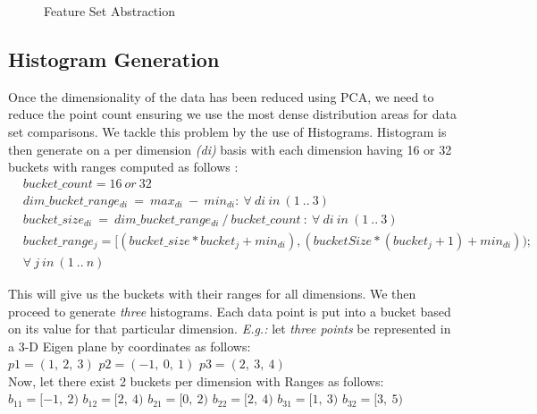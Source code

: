  \begin{figure}[!ht]
	\centering
    \hfill
    \caption{Feature Set Abstraction}
   \label{fig:pca_feature_set_abstraction}
 \end{figure}
  
\subsection{Histogram Generation}
\label{hist_generation}
  Once the dimensionality of the data has been reduced using PCA, we need to reduce the point count ensuring we use the most dense distribution areas for data set comparisons. We tackle this problem by the use of Histograms.
Histogram is then generate on a per dimension \textit{(di)} basis with each dimension having 16 or 32 buckets with ranges computed as follows : 
\begin{equation}
     \begin{aligned}
       & bucket\_count = 16 \ or \  32 \\
       & dim\_bucket\_range_{di}\  =\  max_{di} \   - \   min_{di}: \  \forall\  di\  in\  (1\   ..\   3) \\
       & bucket\_size_{di} \   = \   dim\_bucket\_range_{di} \   / \    bucket\_count \ : \  \forall\  di\  in\  (1\   ..\   3) \\
       &  bucket\_range_j = [(bucket\_size * bucket_j + min_{di}), (bucketSize * (bucket_j + 1) + min_{di})); \\  
       & \forall \ j \ in \ (1\ .. \ n)
     \end{aligned}
\end{equation}

This will give us the buckets with their ranges for all dimensions. We then proceed to generate \textit{three} histograms. Each data point is put into a bucket based on its value for that particular dimension. 
\textit{E.g.:} let \textit{three points} be represented in a 3-D Eigen plane by coordinates as follows: \\
$p1 = (1,\ 2,\ 3)$
$p2 = (-1,\ 0,\ 1)$
$p3 = (2,\ 3,\ 4)$ \\ 
Now, let there exist 2 buckets per dimension with Ranges as follows:  \\
$b_{11} = [-1,\ 2)$
$b_{12} = [2,\ 4)$
$b_{21} = [0, \ 2)$
$b_{22} = [2, \ 4)$
$b_{31} = [1, \ 3)$
$b_{32} = [3, \ 5)$ \\

